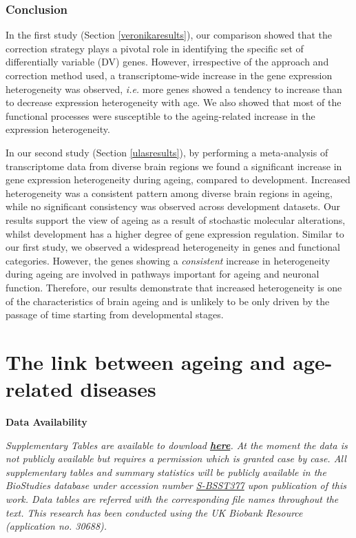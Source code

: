 \documentclass[12pt,twoside]{unicam}
\begin{document}
\hypertarget{conclusion}{%
\subsection{Conclusion}\label{conclusion}}

In the first study (Section \ref{veronikaresults}), our comparison showed that the correction strategy plays a pivotal role in identifying the specific set of differentially variable (DV) genes. However, irrespective of the approach and correction method used, a transcriptome-wide increase in the gene expression heterogeneity was observed, \emph{i.e.} more genes showed a tendency to increase than to decrease expression heterogeneity with age. We also showed that most of the functional processes were susceptible to the ageing-related increase in the expression heterogeneity.

In our second study (Section \ref{ulasresults}), by performing a meta-analysis of transcriptome data from diverse brain regions we found a significant increase in gene expression heterogeneity during ageing, compared to development. Increased heterogeneity was a consistent pattern among diverse brain regions in ageing, while no significant consistency was observed across development datasets. Our results support the view of ageing as a result of stochastic molecular alterations, whilst development has a higher degree of gene expression regulation. Similar to our first study, we observed a widespread heterogeneity in genes and functional categories. However, the genes showing a \emph{consistent} increase in heterogeneity during ageing are involved in pathways important for ageing and neuronal function. Therefore, our results demonstrate that increased heterogeneity is one of the characteristics of brain ageing and is unlikely to be only driven by the passage of time starting from developmental stages.

\hypertarget{UKBBChapter}{%
\chapter{The link between ageing and age-related diseases}\label{UKBBChapter}}

\small

\textbf{Data Availability}

\emph{Supplementary Tables are available to download \textbf{\href{https://drive.google.com/file/d/1j6AJfTOD9euHCdZTlhtWYn22M1KdaQ5A/view?usp=sharing}{here}}. At the moment the data is not publicly available but requires a permission which is granted case by case. All supplementary tables and summary statistics will be publicly available in the BioStudies database under accession number \href{https://www.ebi.ac.uk/biostudies/studies/S-BSST377}{S-BSST377} upon publication of this work. Data tables are referred with the corresponding file names throughout the text. This research has been conducted using the UK Biobank Resource (application no. 30688).}
\end{document}
